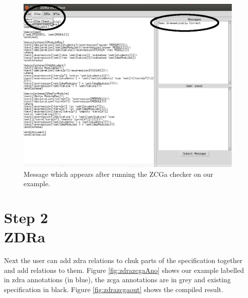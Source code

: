 \begin{figure}[H]
\centering
\includegraphics[scale=0.4]{Figures/fullexample/zcgacorrect.png}
\caption{Message which appears after running the ZCGa checker on our example. \label{fig:zcgacorrect}}
\end{figure}

\section{Step 2\\ZDRa}

Next the user can add \gls{zdra} relations to chuk parts of the specification together and add relations to them. Figure \ref{fig:zdrazcgaAno} shows our example labelled in \gls{zdra} annotations (in blue), the \gls{zcga} annotations are in grey and existing specification in black. Figure \ref{fig:zdrazcgaout} shows the compiled result.


